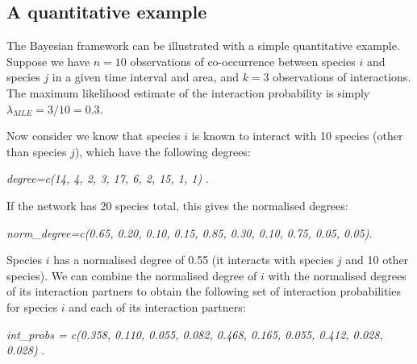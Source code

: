\documentclass[12pt]{article}
\begin{document}
\begin{spacing}{2.0}
\section*{A quantitative example}

  The Bayesian framework can be illustrated with a simple quantitative example. Suppose we have $n = 10$ observations of co-occurrence between species $i$ and species $j$ in a given time interval and area, and $k = 3$ observations of interactions. The maximum likelihood estimate of the interaction probability is simply $\lambda_{MLE} = 3/10 = 0.3$. 
  

  Now consider we know that species $i$ is known to interact with 10 species (other than species $j$), which have the following degrees:

    \vspace{12pt}
    \noindent\emph{
      degree=c(14, 4, 2, 3, 17, 6, 2, 15, 1, 1)
        }.
      \vspace{12pt}

    If the network has 20 species total, this gives the normalised degrees:

    \vspace{12pt}
    \noindent\emph{
      norm\_degree=c(0.65, 0.20, 0.10, 0.15, 0.85, 0.30, 0.10, 0.75, 0.05, 0.05)}.
      \vspace{12pt}

    Species $i$ has a normalised degree of 0.55 (it interacts with species $j$ and 10 other species). We can combine the normalised degree of $i$ with the normalised degrees of its interaction partners to obtain the following set of interaction probabilities for species $i$ and each of its interaction partners:

    \vspace{12pt}
    \noindent\emph{
       int\_probs = c(0.358, 0.110, 0.055, 0.082, 0.468, 0.165, 0.055, 0.412, 0.028, 0.028) }.
      \vspace{12pt}


\end{spacing}
\end{document}
